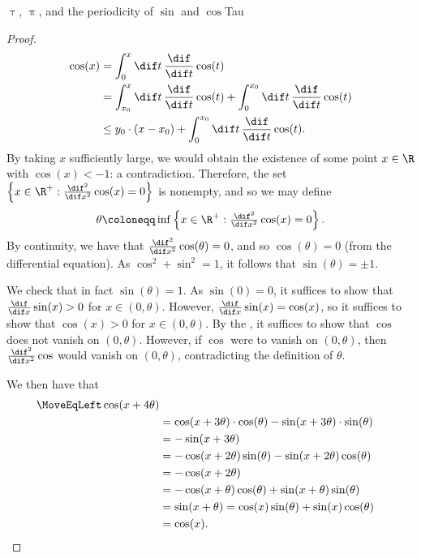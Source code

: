 \begin{prp}{$\uptau$, $\uppi$, and the periodicity of $\sin$ and $\cos$}{Tau}
\begin{proof}
\begin{equation}
\begin{split}
\cos (x) & =\int _0^x\dif t\, \frac{\dif}{\dif t}\cos (t) \\
& =\int _{x_0}^x\dif t\, \frac{\dif}{\dif t}\cos (t)+\int _0^{x_0}\dif t\, \frac{\dif}{\dif t}\cos (t) \\
& \leq y_0\cdot (x-x_0)+\int _0^{x_0}\dif t\, \frac{\dif}{\dif t}\cos (t).
\end{split}
\end{equation}
By taking $x$ sufficiently large, we would obtain the existence of some point $x\in \R$ with $\cos (x)<-1$:  a contradiction.  Therefore, the set $\left\{ x\in \R ^+:\frac{\dif ^2}{\dif x^2}\cos (x)=0\right\}$ is nonempty, and so we may define
\begin{equation}
\theta \coloneqq \inf \left\{ x\in \R ^+:\tfrac{\dif ^2}{\dif x^2}\cos (x)=0\right\} .
\end{equation}
By continuity, we have that $\frac{\dif ^2}{\dif x^2}\cos (\theta )=0$, and so $\cos (\theta )=0$ (from the differential equation).  As $\cos ^2+\sin ^2=1$, it follows that $\sin (\theta )=\pm 1$.

We check that in fact $\sin (\theta )=1$.  As $\sin (0)=0$, it suffices to show that $\frac{\dif}{\dif x}\sin (x)>0$ for $x\in (0,\theta )$.  However, $\frac{\dif}{\dif x}\sin (x)=\cos (x)$, so it suffices to show that $\cos (x)>0$ for $x\in (0,\theta )$.  By the , it suffices to show that $\cos$ does not vanish on $(0,\theta )$.  However, if $\cos$ were to vanish on $(0,\theta )$, then $\frac{\dif ^2}{\dif x^2}\cos$ would vanish on $(0,\theta )$, contradicting the definition of $\theta$.

We then have that
\begin{equation}
\begin{split}
\MoveEqLeft
\cos (x+4\theta ) \\
& =\cos (x+3\theta )\cdot \cos (\theta )-\sin (x+3\theta )\cdot \sin (\theta ) \\
& =-\sin (x+3\theta ) \\
& =-\cos (x+2\theta )\sin (\theta )-\sin (x+2\theta )\cos (\theta ) \\
& =-\cos (x+2\theta ) \\
& =-\cos (x+\theta )\cos (\theta )+\sin (x+\theta )\sin (\theta ) \\
& =\sin (x+\theta )=\cos (x)\sin (\theta )+\sin (x)\cos (\theta ) \\
& =\cos (x).
\end{split}
\end{equation}


\end{proof}
\end{prp}
